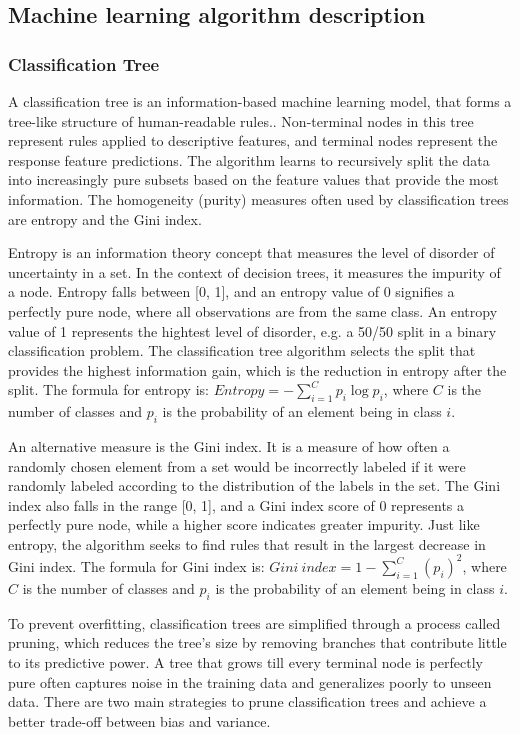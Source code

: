 \documentclass[conference]{IEEEtran}
\begin{document}
\subsection{\textbf{Machine learning algorithm description}}

\subsubsection{\textbf{Classification Tree}}

A classification tree is an information-based machine learning model, that forms a tree-like structure of human-readable rules.. Non-terminal nodes in this tree represent rules applied to descriptive features, and terminal nodes represent the response feature predictions. The algorithm learns to recursively split the data into increasingly pure subsets based on the feature values that provide the most information. The homogeneity (purity) measures often used by classification trees are entropy and the Gini index.

Entropy is an information theory concept that measures the level of disorder of uncertainty in a set. In the context of decision trees, it measures the impurity of a node. Entropy falls between [0, 1], and an entropy value of 0 signifies a perfectly pure node, where all observations are from the same class. An entropy value of 1 represents the hightest level of disorder, e.g. a 50/50 split in a binary classification problem. The classification tree algorithm selects the split that provides the highest information gain, which is the reduction in entropy after the split. The formula for entropy is: $Entropy = -\sum_{i=1}^{C} p_i \log p_i$, where $C$ is the number of classes and $p_i$ is the probability of an element being in class $i$.

An alternative measure is the Gini index. It is a measure of how often a randomly chosen element from a set would be incorrectly labeled if it were randomly labeled according to the distribution of the labels in the set. The Gini index also falls in the range [0, 1], and a Gini index score of 0 represents a perfectly pure node, while a higher score indicates greater impurity. Just like entropy, the algorithm seeks to find rules that result in the largest decrease in Gini index. The formula for Gini index is: $Gini\ index = 1 - \sum_{i=1}^{C} (p_i)^2$, where $C$ is the number of classes and $p_i$ is the probability of an element being in class $i$.

To prevent overfitting, classification trees are simplified through a process called pruning, which reduces the tree's size by removing branches that contribute little to its predictive power. A tree that grows till every terminal node is perfectly pure often captures noise in the training data and generalizes poorly to unseen data. There are two main strategies to prune classification trees and achieve a better trade-off between bias and variance.
\end{document}
